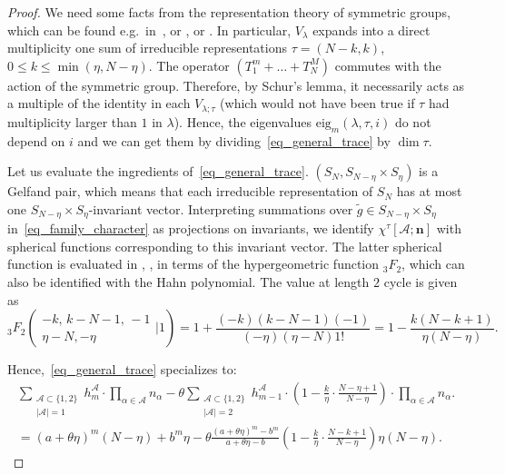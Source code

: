 \begin{proof}
 We need some facts from the representation theory of symmetric groups, which can be found e.g.\ in~\cite{dunkl1978addition}, or \cite[Section 3]{Stanton1984}, or \cite[Sections 6.1, 6.2]{ceccherini2008harmonic}. In particular, $V_\lambda$ expands into a direct multiplicity one sum of irreducible representations $\tau=(N-k,k)$, $0\le k\le \min(\eta,N-\eta)$.
 The operator $(T_1^m+\dots+T_N^M)$ commutes with the action of the symmetric group. Therefore, by Schur's lemma, it necessarily acts as a multiple of the identity in each $V_{\lambda;\tau}$ (which would not have been true if $\tau$ had multiplicity larger than $1$ in $\lambda$). Hence, the eigenvalues $\mathrm{eig}_m(\lambda,\tau,i)$ do not depend on $i$ and we can get them by dividing~\eqref{eq_general_trace} by $\dim \tau$.

 Let us evaluate the ingredients of~\eqref{eq_general_trace}. $(S_N,S_{N-\eta}\times S_\eta)$ is a Gelfand pair, which means that each irreducible representation of $S_N$ has at most one $S_{N-\eta}\times S_\eta$-invariant vector. Interpreting summations over $\tilde g \in S_{N-\eta}\times S_\eta$ in~\eqref{eq_family_character} as projections on invariants, we identify $ \chi^\tau[\mathcal A; \mathbf n]$ with spherical functions corresponding to this invariant vector. The latter spherical function is evaluated in \cite[Corollary 2.2]{dunkl1978addition}, \cite[(3.15)]{Stanton1984},  \cite[Theorems 6.1.10, 6.2.3]{ceccherini2008harmonic} in terms of the hypergeometric function $_3F_2$, which can also be identified with the Hahn polynomial. The value at length $2$ cycle is given as
 \begin{equation}
  _3 F_2\left( \begin{smallmatrix}-k,\, k-N-1,\, -1 \\ \eta-N, -\eta  \end{smallmatrix} \Bigr|  1 \right)=1 + \frac{(-k) (k-N-1) (-1)}{(-\eta)(\eta-N) 1!}=1-\frac{k(N-k+1)}{\eta(N-\eta)}.
 \end{equation}

Hence,~\eqref{eq_general_trace} specializes to:
\begin{multline*}
   \sum_{\begin{smallmatrix}\mathcal A\subset \{1,2\}\\ |\mathcal A|=1\end{smallmatrix}}  h^{\mathcal A}_{m}  \cdot \prod_{\alpha\in \mathcal A} n_\alpha
 -\theta \sum_{\begin{smallmatrix}\mathcal A\subset \{1,2\}\\ |\mathcal A|=2\end{smallmatrix}}  h^{\mathcal A}_{m-1} \cdot  \left(1-\frac{k}{\eta}\cdot \frac{N-\eta+1}{N-\eta }\right)\cdot \prod_{\alpha\in \mathcal A} n_\alpha.
 \\=(a+\theta \eta)^m (N-\eta) + b^m \eta-\theta \frac{(a+\theta \eta)^m- b^m}{a+\theta \eta -b}  \left(1-\frac{k}{\eta}\cdot \frac{N-k+1}{N-\eta }\right) \eta (N-\eta).
 \end{multline*}
\end{proof}

